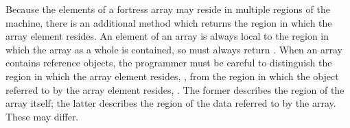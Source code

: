 Because the elements of a fortress array may reside in multiple
regions of the machine, there is an additional method
 which returns the region in which the array
element  resides.  An element of an array is always local to
the region in which the array as a whole is contained, so
 must always
return .  When an array contains reference objects, the
programmer must be careful to distinguish the region in which the
array element  resides, , from the
region in which the object referred to by the array element resides,
.  The former describes the region of the array
itself; the latter describes the region of the data referred to by the
array.  These may differ.
